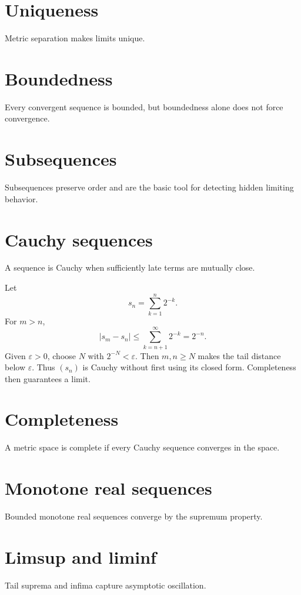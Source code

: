 \section{Uniqueness}
Metric separation makes limits unique.

\section{Boundedness}
Every convergent sequence is bounded, but boundedness alone does not force convergence.

\section{Subsequences}
Subsequences preserve order and are the basic tool for detecting hidden limiting behavior.

\section{Cauchy sequences}
A sequence is Cauchy when sufficiently late terms are mutually close.


\begin{example}\label{ex:ii03-expand-02}
Let
\[
s_n=\sum_{k=1}^n2^{-k}.
\]
For \(m>n\),
\[
|s_m-s_n|
\le\sum_{k=n+1}^\infty2^{-k}=2^{-n}.
\]
Given \(\varepsilon>0\), choose \(N\) with \(2^{-N}<\varepsilon\). Then
\(m,n\ge N\) makes the tail distance below \(\varepsilon\). Thus \((s_n)\) is
Cauchy without first using its closed form. Completeness then guarantees a
limit.
\end{example}
\section{Completeness}
A metric space is complete if every Cauchy sequence converges in the space.

\section{Monotone real sequences}
Bounded monotone real sequences converge by the supremum property.

\section{Limsup and liminf}
Tail suprema and infima capture asymptotic oscillation.


